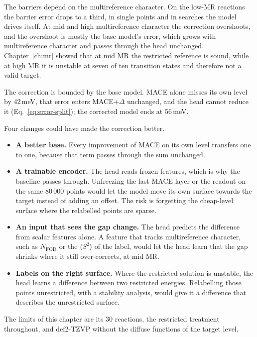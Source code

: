 The barriers depend on the multireference character. On the low-MR
reactions the barrier error drops to a third, in single points and in
searches the model drives itself. At mid and high multireference
character the correction overshoots, and the overshoot is mostly the
base model's error, which grows with multireference character and
passes through the head unchanged. Chapter~\ref{ch:mr} showed that
at mid MR the restricted reference is sound, while at high MR it is
unstable at seven of ten transition states and therefore not a valid
target.

The correction is bounded by the base model. MACE alone misses its
own level by 42\,meV, that error enters MACE+$\Delta$ unchanged, and
the head cannot reduce it (Eq.~\eqref{eq:error-split}); the corrected
model ends at 56\,meV.

Four changes could have made the correction better.

\begin{itemize}
  \item \textbf{A better base.} Every improvement of MACE on its own
    level transfers one to one, because that term passes through the
    sum unchanged.
  \item \textbf{A trainable encoder.} The head reads frozen features,
    which is why the baseline passes through. Unfreezing the last MACE
    layer or the readout on the same 80\,000 points would let the model
    move its own surface towards the target instead of adding an
    offset. The risk is forgetting the cheap-level surface where the
    relabelled points are sparse.
  \item \textbf{An input that sees the gap change.} The head predicts
    the difference from scalar features alone. A feature that tracks
    multireference character, such as $N_\text{FOD}$ or the
    $\langle S^2 \rangle$ of the label, would let the head learn that
    the gap shrinks where it still over-corrects, at mid MR.
  \item \textbf{Labels on the right surface.} Where the restricted
    solution is unstable, the head learns a difference between two
    restricted energies. Relabelling those points unrestricted, with a
    stability analysis, would give it a difference that describes the
    unrestricted surface.
\end{itemize}

The limits of this chapter are its 30 reactions, the restricted
treatment throughout, and def2-TZVP without the diffuse functions of
the target level.

